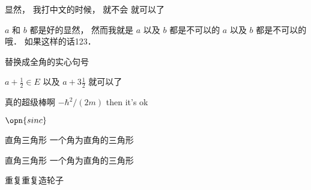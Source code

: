 
显然， 我打中文的时候， 就不会  就可以了

$a$ 和 $b$ 都是好的显然， 然而我就是 $a$ 以及 $b$ 都是不可以的 $a$ 以及 $b$ 都是不可以的哦． 如果这样的话123．

替换成全角的实心句号

$a + \frac12 \in E$ 以及 $a + 3 \frac{1}{2}$ 就可以了

真的超级棒啊 $-\hbar^2/(2m)$ then it's ok

$\opn{sinc}$

\begin{definition}{直角三角形}
一个角为直角的三角形
\end{definition}

\begin{definition}{直角三角形}
一个角为直角的三角形
\end{definition}

重复重复造轮子